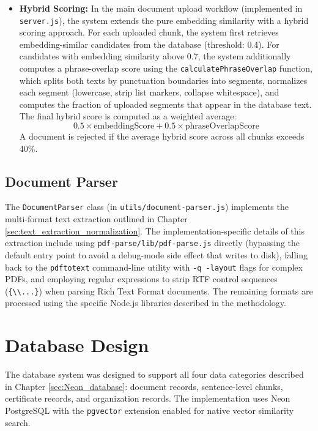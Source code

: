 \begin{itemize}
\item \textbf{Hybrid Scoring:} In the main document upload workflow (implemented in \texttt{server.js}), the system extends the pure embedding similarity with a hybrid scoring approach. For each uploaded chunk, the system first retrieves embedding-similar candidates from the database (threshold: 0.4). For candidates with embedding similarity above 0.7, the system additionally computes a phrase-overlap score using the \texttt{calculatePhraseOverlap} function, which splits both texts by punctuation boundaries into segments, normalizes each segment (lowercase, strip list markers, collapse whitespace), and computes the fraction of uploaded segments that appear in the database text. The final hybrid score is computed as a weighted average: $$0.5 \times \text{embeddingScore} + 0.5 \times \text{phraseOverlapScore}$$ A document is rejected if the average hybrid score across all chunks exceeds 40\%.
\end{itemize}

\subsection{Document Parser}

The \texttt{DocumentParser} class (in \texttt{utils/document-parser.js}) implements the multi-format text extraction outlined in Chapter \ref{sec:text_extraction_normalization}. The implementation-specific details of this extraction include using \texttt{pdf-parse/lib/pdf-parse.js} directly (bypassing the default entry point to avoid a debug-mode side effect that writes to disk), falling back to the \texttt{pdftotext} command-line utility with \texttt{-q -layout} flags for complex PDFs, and employing regular expressions to strip RTF control sequences (\texttt{\{\textbackslash\textbackslash...\}}) when parsing Rich Text Format documents. The remaining formats are processed using the specific Node.js libraries described in the methodology.

\section{Database Design}

The database system was designed to support all four data categories described in Chapter \ref{sec:Neon_database}: document records, sentence-level chunks, certificate records, and organization records. The implementation uses Neon PostgreSQL with the \texttt{pgvector} extension enabled for native vector similarity search.

